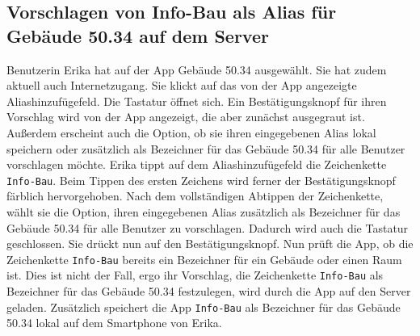 \subsection{Vorschlagen von Info-Bau als Alias für Gebäude 50.34 auf dem Server}

Benutzerin Erika hat auf der App Gebäude 50.34 ausgewählt. Sie hat zudem aktuell auch Internetzugang. Sie klickt auf das von der App angezeigte Aliashinzufügefeld. Die Tastatur öffnet sich. Ein Bestätigungsknopf für ihren Vorschlag wird von der App angezeigt, die aber zunächst ausgegraut ist. Außerdem erscheint auch die Option, ob sie ihren eingegebenen Alias lokal speichern oder zusätzlich als Bezeichner für das Gebäude 50.34 für alle Benutzer vorschlagen möchte. Erika tippt auf dem Aliashinzufügefeld die Zeichenkette \texttt{Info-Bau}. Beim Tippen des ersten Zeichens wird ferner der Bestätigungsknopf färblich hervorgehoben. Nach dem vollständigen Abtippen der Zeichenkette, wählt sie die Option, ihren eingegebenen Alias zusätzlich als Bezeichner für das Gebäude 50.34 für alle Benutzer zu vorschlagen. Dadurch wird auch die Tastatur geschlossen. Sie drückt nun auf den Bestätigungsknopf. Nun prüft die App, ob die Zeichenkette \texttt{Info-Bau} bereits ein Bezeichner für ein Gebäude oder einen Raum ist. Dies ist nicht der Fall, ergo ihr Vorschlag, die Zeichenkette \texttt{Info-Bau} als Bezeichner für das Gebäude 50.34 festzulegen, wird durch die App auf den Server geladen. Zusätzlich speichert die App \texttt{Info-Bau} als Bezeichner für das Gebäude 50.34 lokal auf dem Smartphone von Erika.